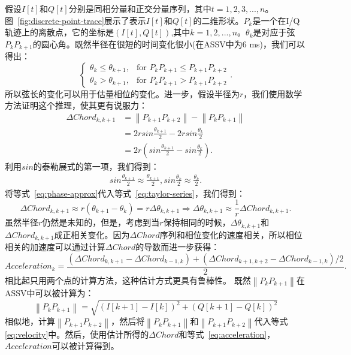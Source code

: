 假设$I[t]$和$Q[t]$分别是同相分量和正交分量序列，其中$t=1,2,3,...,n$。图~\ref{fig:discrete-point-trace}展示了表示$I[t]$和$Q[t]$的二维形状。$P_k$是一个在I/Q轨迹上的离散点，它的坐标是$(I[t],Q[t])$,其中$k=1,2,...,n$。$\theta_{k}$是对应于弦$P_{k}P_{k+1}$的圆心角。既然半径在很短的时间变化很小(在ASSV中为6 ms)，我们可以得出：
$$
\begin{cases} 
  \theta_{k} \leq \theta_{k+1}, & \text{for } P_{k}P_{k+1} \leq P_{k+1}P_{k+2}  \\
  \theta_{k} > \theta_{k+1},  & \text{for } P_{k}P_{k+1} > P_{k+1}P_{k+2}
\end{cases}
.
$$
所以弦长的变化可以用于估量相位的变化。进一步，假设半径为$r$，我们使用数学方法证明这个推理，使其更有说服力：
\begin{align}
\Delta Chord_{k,k+1} &= \left\|P_{k+1}P_{k+2}\right\| - \left\|P_{k}P_{k+1}\right\|  \\ \label{eq:phase-approx}
&= 2rsin\frac{\theta_{k+1}}{2} - 2rsin\frac{\theta_{k}}{2} \nonumber \\  
&= 2r\left(sin\frac{\theta_{k+1}}{2} - sin\frac{\theta_{k}}{2}\right)  
.
\end{align}
利用$sin$的泰勒展式的第一项，我们得到：
\begin{align}
   sin\frac{\theta_{k+1}}{2} \approx \frac{\theta_{k+1}}{2} , sin\frac{\theta_{k}}{2} \approx \frac{\theta_{k}}{2}. \label{eq:taylor-series}
\end{align}
将等式~\eqref{eq:phase-approx}代入等式~\eqref{eq:taylor-series}，我们得到：
\begin{equation}
 \Delta Chord_{k,k+1} \approx r(\theta_{k+1} - \theta_{k})=r\Delta \theta_{k,k+1} \Rightarrow \Delta \theta_{k,k+1} \approx \frac{1}{r}\Delta Chord_{k,k+1}.  \label{eq:velocity}
\end{equation}
虽然半径$r$仍然是未知的，但是，考虑到当$r$保持相同的时候，$\Delta \theta_{k,k+1}$和$\Delta Chord_{k,k+1}$成正相关变化。因为$\Delta Chord$序列和相位变化的速度相关，所以相位相关的加速度可以通过计算$\Delta Chord$的导数而进一步获得：
\begin{equation}
Acceleration_{k} = \frac{\left( \Delta Chord_{k,k+1} - \Delta Chord_{k-1,k} \right) + \left( \Delta Chord_{k+1,k+2}- \Delta Chord_{k-1,k}\right)/2}{2}. \label{eq:acceleration}
\end{equation}
相比起只用两个点的计算方法，这种估计方式更具有鲁棒性。
既然$\left\|P_{k}P_{k+1}\right\|$在ASSV中可以被计算为：
\begin{equation}
  \left\|P_{k}P_{k+1}\right\|= \sqrt{\left( I[k+1] - I[k] \right)^2 + \left( Q[k+1] - Q[k] \right)^2}
\end{equation}
相似地，计算$\left\|P_{k+1}P_{k+2}\right\|$，然后将$\left\|P_{k}P_{k+1}\right\|$和$\left\|P_{k+1}P_{k+2}\right\|$代入等式\eqref{eq:velocity}中。然后，使用估计所得的$\Delta Chord $和等式~\eqref{eq:acceleration}，$Acceleration$可以被计算得到。

